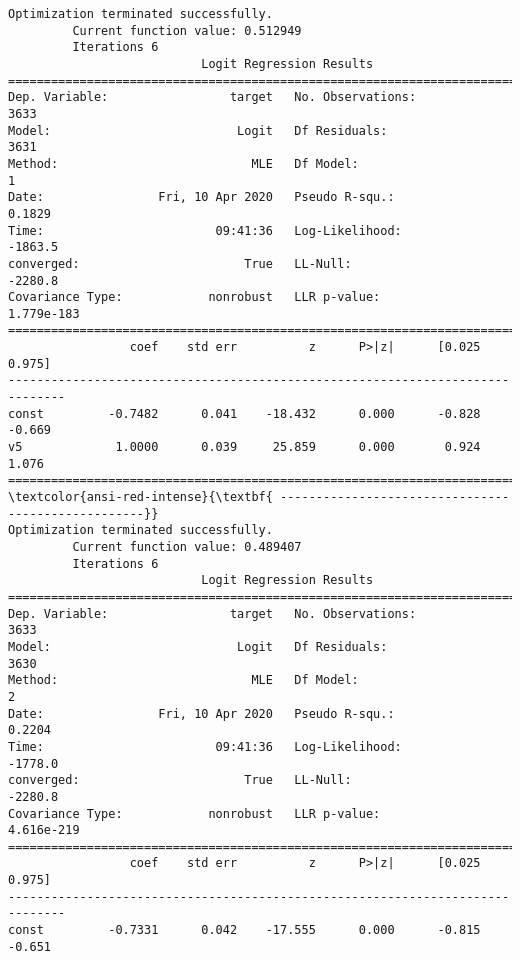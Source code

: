 \documentclass[11pt]{article}
\begin{document}
    \begin{Verbatim}[commandchars=\\\{\}]
Optimization terminated successfully.
         Current function value: 0.512949
         Iterations 6
                           Logit Regression Results                           
==============================================================================
Dep. Variable:                 target   No. Observations:                 3633
Model:                          Logit   Df Residuals:                     3631
Method:                           MLE   Df Model:                            1
Date:                Fri, 10 Apr 2020   Pseudo R-squ.:                  0.1829
Time:                        09:41:36   Log-Likelihood:                -1863.5
converged:                       True   LL-Null:                       -2280.8
Covariance Type:            nonrobust   LLR p-value:                1.779e-183
==============================================================================
                 coef    std err          z      P>|z|      [0.025      0.975]
------------------------------------------------------------------------------
const         -0.7482      0.041    -18.432      0.000      -0.828      -0.669
v5             1.0000      0.039     25.859      0.000       0.924       1.076
==============================================================================
\textcolor{ansi-red-intense}{\textbf{ ---------------------------------------------------}}
Optimization terminated successfully.
         Current function value: 0.489407
         Iterations 6
                           Logit Regression Results                           
==============================================================================
Dep. Variable:                 target   No. Observations:                 3633
Model:                          Logit   Df Residuals:                     3630
Method:                           MLE   Df Model:                            2
Date:                Fri, 10 Apr 2020   Pseudo R-squ.:                  0.2204
Time:                        09:41:36   Log-Likelihood:                -1778.0
converged:                       True   LL-Null:                       -2280.8
Covariance Type:            nonrobust   LLR p-value:                4.616e-219
==============================================================================
                 coef    std err          z      P>|z|      [0.025      0.975]
------------------------------------------------------------------------------
const         -0.7331      0.042    -17.555      0.000      -0.815      -0.651

\end{Verbatim}
\end{document}
